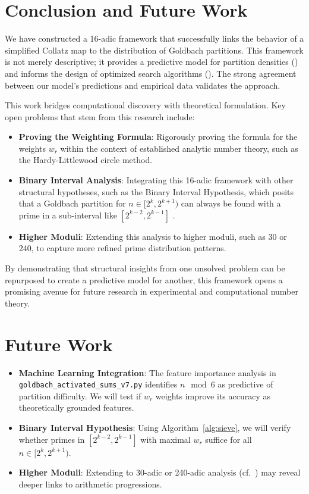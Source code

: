 \documentclass[12pt]{article}
\begin{document}
	\section{Conclusion and Future Work}
	
	We have constructed a 16-adic framework that successfully links the behavior of a simplified Collatz map to the distribution of Goldbach partitions. This framework is not merely descriptive; it provides a predictive model for partition densities () and informs the design of optimized search algorithms (). The strong agreement between our model's predictions and empirical data validates the approach.
	
	This work bridges computational discovery with theoretical formulation. Key open problems that stem from this research include:
	\begin{itemize}
		\item \textbf{Proving the Weighting Formula}: Rigorously proving the formula for the weights $w_r$ within the context of established analytic number theory, such as the Hardy-Littlewood circle method.
		\item \textbf{Binary Interval Analysis}: Integrating this 16-adic framework with other structural hypotheses, such as the Binary Interval Hypothesis, which posits that a Goldbach partition for $n \in [2^k, 2^{k+1})$ can always be found with a prime in a sub-interval like $[2^{k-2}, 2^{k-1}]$ .
		\item \textbf{Higher Moduli}: Extending this analysis to higher moduli, such as 30 or 240, to capture more refined prime distribution patterns.
	\end{itemize}
	
	By demonstrating that structural insights from one unsolved problem can be repurposed to create a predictive model for another, this framework opens a promising avenue for future research in experimental and computational number theory.
	
	\section{Future Work}
	\begin{itemize}
		\item \textbf{Machine Learning Integration}: The feature importance analysis in \texttt{goldbach\_activated\_sums\_v7.py} identifies $n \mod 6$ as predictive of partition difficulty. We will test if $w_r$ weights improve its accuracy as theoretically grounded features.
		
		\item \textbf{Binary Interval Hypothesis}: Using Algorithm~\ref{alg:sieve}, we will verify whether primes in $[2^{k-2}, 2^{k-1}]$ with maximal $w_r$ suffice for all $n \in [2^k, 2^{k+1})$.
		
		\item \textbf{Higher Moduli}: Extending to 30-adic or 240-adic analysis (cf.~\cite{green_tao}) may reveal deeper links to arithmetic progressions.
	\end{itemize} 
	
\end{document}
